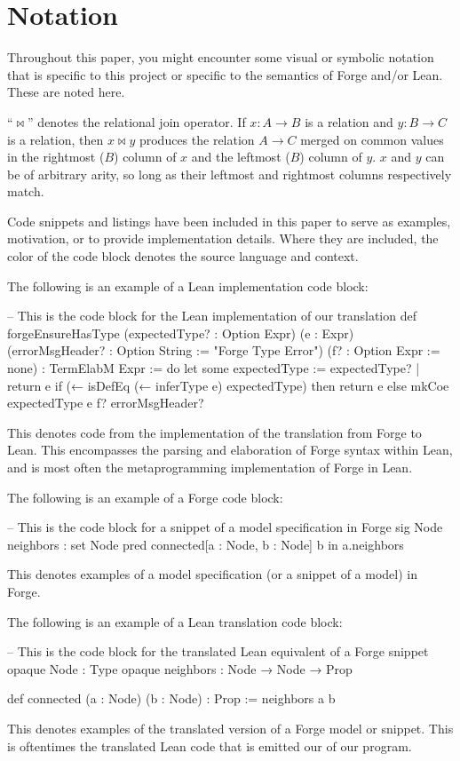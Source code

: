 \newpage
{
  \hypersetup{linkcolor=black}
  \tableofcontents
}

\newpage
\section*{Notation}
Throughout this paper, you might encounter some visual or symbolic notation that is specific to this project or specific to the semantics of Forge and/or Lean. These are noted here. 

``$\bowtie$'' denotes the relational join operator. If $x: A \to B$ is a relation and $y: B \to C$ is a relation, then $x\bowtie y$ produces the relation $A\to C$ merged on common values in the rightmost ($B$) column of $x$ and the leftmost ($B$) column of $y$. $x$ and $y$ can be of arbitrary arity, so long as their leftmost and rightmost columns respectively match. 

Code snippets and listings have been included in this paper to serve as examples, motivation, or to provide implementation details. Where they are included, the color of the code block denotes the source language and context. 

The following is an example of a Lean implementation code block:
\begin{leanimpl}
-- This is the code block for the Lean implementation of our translation
def forgeEnsureHasType (expectedType? : Option Expr) (e : Expr)
    (errorMsgHeader? : Option String := "Forge Type Error") 
    (f? : Option Expr := none) : TermElabM Expr := do
  let some expectedType := expectedType? | return e
  if (← isDefEq (← inferType e) expectedType) then
    return e
  else
    mkCoe expectedType e f? errorMsgHeader?
\end{leanimpl}
This denotes code from the implementation of the translation from Forge to Lean. This encompasses the parsing and elaboration of Forge syntax within Lean, and is most often the metaprogramming implementation of Forge in Lean. 

The following is an example of a Forge code block: 
\begin{forge}
-- This is the code block for a snippet of a model specification in Forge
sig Node {
  neighbors : set Node
}
pred connected[a : Node, b : Node] {
  b in a.neighbors
}
\end{forge}
This denotes examples of a model specification (or a snippet of a model) in Forge. 

The following is an example of a Lean translation code block:
\begin{lean}
-- This is the code block for the translated Lean equivalent of a Forge snippet
opaque Node : Type
opaque neighbors : Node → Node → Prop

def connected (a : Node) (b : Node) : Prop :=
  neighbors a b
\end{lean}
This denotes examples of the translated version of a Forge model or snippet. This is oftentimes the translated Lean code that is emitted our of our program. 